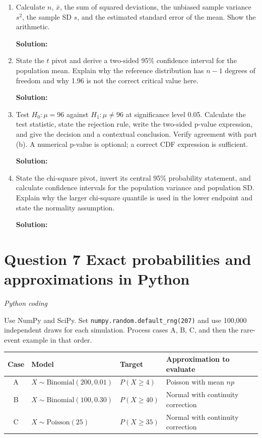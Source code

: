 \documentclass[11pt]{article}
\newcommand{\solution}{\par\medskip\noindent\textbf{Solution:}\par\vspace{0cm}}
\begin{document}
\begin{enumerate}[label=\textbf{(\alph*)}]
  \item Calculate $n$, $\bar{x}$, the sum of squared deviations, the unbiased sample variance $s^2$, the sample SD $s$, and the estimated standard error of the mean. Show the arithmetic.
  \solution

  \item State the $t$ pivot and derive a two-sided 95\% confidence interval for the population mean. Explain why the reference distribution has $n - 1$ degrees of freedom and why 1.96 is not the correct critical value here.
  \solution

  \item Test $H_0: \mu = 96$ against $H_1: \mu \neq 96$ at significance level 0.05. Calculate the test statistic, state the rejection rule, write the two-sided p-value expression, and give the decision and a contextual conclusion. Verify agreement with part (b). A numerical p-value is optional; a correct CDF expression is sufficient.
  \solution

  \item State the chi-square pivot, invert its central 95\% probability statement, and calculate confidence intervals for the population variance and population SD. Explain why the larger chi-square quantile is used in the lower endpoint and state the normality assumption.
  \solution
\end{enumerate}

\newpage
\section*{Question 7 \quad Exact probabilities and approximations in Python}
\textit{Python coding}

Use NumPy and SciPy. Set \texttt{numpy.random.default\_rng(207)} and use 100,000 independent draws for each simulation. Process cases A, B, C, and then the rare-event example in that order.

\begin{center}
\begin{tabular}{clll}
\toprule
Case & Model & Target & Approximation to evaluate \\
\midrule
A & $X \sim \text{Binomial}(200, 0.01)$ & $P(X \geq 4)$  & Poisson with mean $np$ \\
B & $X \sim \text{Binomial}(100, 0.30)$ & $P(X \geq 40)$ & Normal with continuity correction \\
C & $X \sim \text{Poisson}(25)$         & $P(X \geq 35)$ & Normal with continuity correction \\
\bottomrule
\end{tabular}
\end{center}
\end{document}

